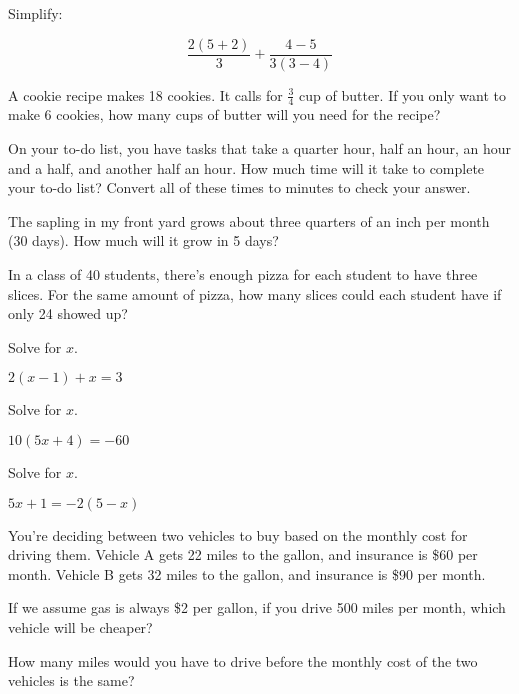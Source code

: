 \begin{exercise}
	Simplify:
	
	$$\frac{2(5+2)}{3} + \frac{4-5}{3(3-4)}$$
\end{exercise}
\bigskip

\begin{exercise}
A cookie recipe makes 18 cookies.  It calls for $\frac{3}{4}$ cup of butter.  If you only want to make 6 cookies, how many cups of butter will you need for the recipe?
\end{exercise}
\bigskip

\begin{exercise}
On your to-do list, you have tasks that take a quarter hour, half an hour, an hour and a half, and another half an hour.  How much time will it take to complete your to-do list?  Convert all of these times to minutes to check your answer.
\end{exercise}
\bigskip

\begin{exercise}
The sapling in my front yard grows about three quarters of an inch per month (30 days).  How much will it grow in 5 days?
\end{exercise}
\bigskip

\begin{exercise}
In a class of 40 students, there's enough pizza for each student to have three slices.  For the same amount of pizza, how many slices could each student have if only 24 showed up?
\end{exercise}
\bigskip

\begin{exercise}
Solve for $x$.

$2(x-1)+x = 3$
\end{exercise}
\bigskip

\begin{exercise}
Solve for $x$.

$10(5x+4) = -60$
\end{exercise}
\bigskip

\begin{exercise}
Solve for $x$.

$5x + 1 = -2(5-x)$
\end{exercise}
\bigskip

\begin{exercise}
You're deciding between two vehicles to buy based on the monthly cost for driving them.  Vehicle A gets 22 miles to the gallon, and insurance is \$60 per month.  Vehicle B gets 32 miles to the gallon, and insurance is \$90 per month.

If we assume gas is always \$2 per gallon, if you drive 500 miles per month, which vehicle will be cheaper?

How many miles would you have to drive before the monthly cost of the two vehicles is the same?
\end{exercise}
\bigskip

